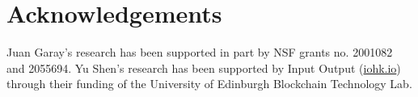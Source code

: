 \section*{Acknowledgements}

Juan Garay's research has been supported in part by NSF grants no. 2001082 and 2055694.
%
Yu Shen's research has been supported by Input Output (\url{iohk.io}) through their funding of the University of Edinburgh Blockchain Technology Lab.
